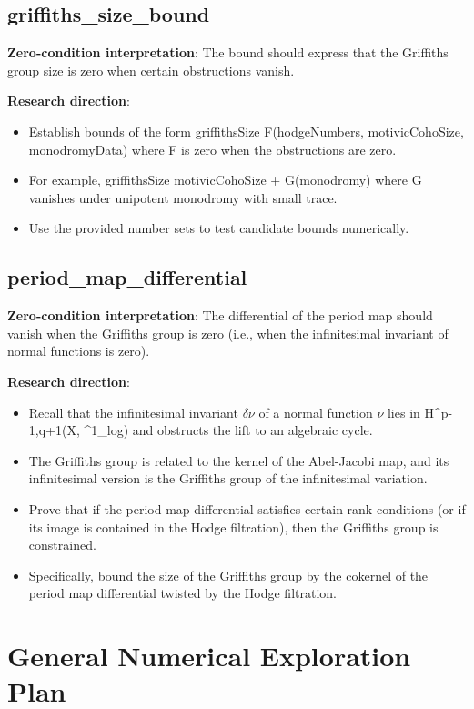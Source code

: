 \documentclass[11pt]{article}
\begin{document}
\subsection{griffiths\_size\_bound}
\textbf{Zero-condition interpretation}: The bound should express that the Griffiths group size is zero when certain obstructions vanish.

\textbf{Research direction}:
\begin{itemize}
\item Establish bounds of the form griffithsSize \leq F(hodgeNumbers, motivicCohoSize, monodromyData) where F is zero when the obstructions are zero.
\item For example, griffithsSize \leq motivicCohoSize + G(monodromy) where G vanishes under unipotent monodromy with small trace.
\item Use the provided number sets to test candidate bounds numerically.
\end{itemize}

\subsection{period\_map\_differential}
\textbf{Zero-condition interpretation}: The differential of the period map should vanish when the Griffiths group is zero (i.e., when the infinitesimal invariant of normal functions is zero).

\textbf{Research direction}:
\begin{itemize}
\item Recall that the infinitesimal invariant $\delta\nu$ of a normal function $\nu$ lies in H^{p-1,q+1}(X, \Omega^1\_log) and obstructs the lift to an algebraic cycle.
\item The Griffiths group is related to the kernel of the Abel-Jacobi map, and its infinitesimal version is the Griffiths group of the infinitesimal variation.
\item Prove that if the period map differential satisfies certain rank conditions (or if its image is contained in the Hodge filtration), then the Griffiths group is constrained.
\item Specifically, bound the size of the Griffiths group by the cokernel of the period map differential twisted by the Hodge filtration.
\end{itemize}

\section{General Numerical Exploration Plan}
\end{document}
